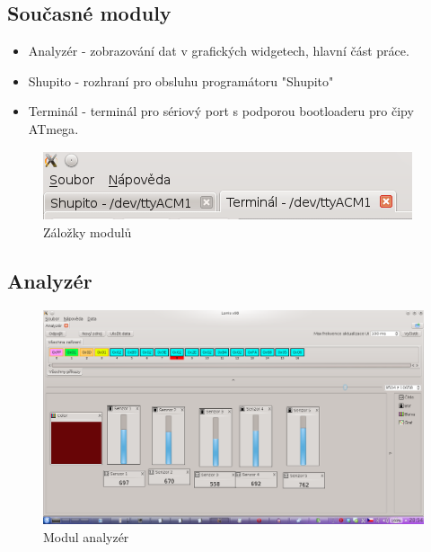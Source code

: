 \documentclass[12pt, a4paper, oneside]{article}
\begin{document}
\subsection*{Současné moduly}
    \begin{itemize}
        \item Analyzér - zobrazování dat v grafických widgetech, hlavní část práce.
        \item Shupito - rozhraní pro obsluhu programátoru "Shupito"\cite{shupito}
        \item Terminál - terminál pro sériový port s podporou bootloaderu pro čipy ATmega\cite{avr232client}.
    \end{itemize}
\begin{figure}[h]
\begin{center}
\includegraphics{img/tabs.png}
\caption{Záložky modulů}
\label{Moduly}
\end{center}
\end{figure}

\newpage
\setlength{\voffset}{0mm} %
\pagestyle{plain}

\subsection*{Analyzér}

\begin{figure}[h]
\begin{center}
\includegraphics[width=\textwidth]{img/analyzer_all.png}
\caption{Modul analyzér}
\label{Analyzer}
\end{center}
\end{figure}
\end{document}
